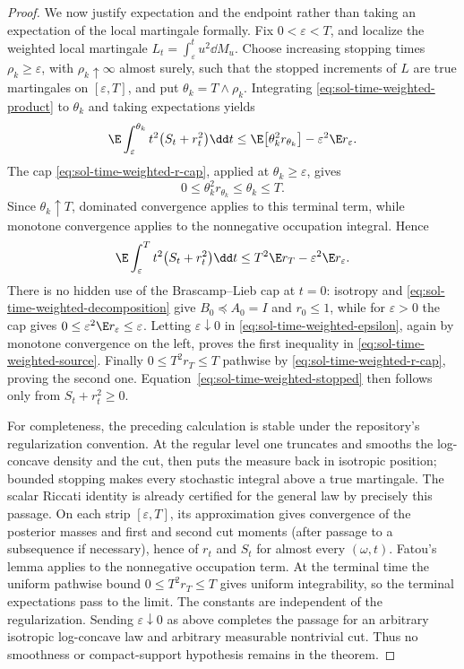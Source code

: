 \documentclass[../main.tex]{subfiles}
\begin{document}
\begin{proof}
We now justify expectation and the endpoint rather than taking an expectation of the local
martingale formally.  Fix $0<\varepsilon<T$, and localize the weighted local martingale
$L_t=\int_\varepsilon^t u^2\dd M_u$.  Choose increasing stopping times
$\rho_k\ge\varepsilon$, with $\rho_k\uparrow\infty$ almost surely, such that the stopped
increments of $L$ are true martingales on $[\varepsilon,T]$, and put
$\theta_k=T\wedge\rho_k$.  Integrating \eqref{eq:sol-time-weighted-product} to $\theta_k$ and
taking expectations yields
\begin{equation}
 \E\int_\varepsilon^{\theta_k}
      t^2\bigl(S_t+r_t^2\bigr)\dd t
 \le \E\bigl[\theta_k^2r_{\theta_k}\bigr]
      -\varepsilon^2\E r_\varepsilon.
 \label{eq:sol-time-weighted-localized}
\end{equation}
The cap \eqref{eq:sol-time-weighted-r-cap}, applied at $\theta_k\ge\varepsilon$, gives
\[
 0\le\theta_k^2r_{\theta_k}\le\theta_k\le T.
\]
Since $\theta_k\uparrow T$, dominated convergence applies to this terminal term, while monotone
convergence applies to the nonnegative occupation integral.  Hence
\begin{equation}
 \E\int_\varepsilon^Tt^2\bigl(S_t+r_t^2\bigr)\dd t
 \le T^2\E r_T-\varepsilon^2\E r_\varepsilon.
 \label{eq:sol-time-weighted-epsilon}
\end{equation}
There is no hidden use of the Brascamp--Lieb cap at $t=0$: isotropy and
\eqref{eq:sol-time-weighted-decomposition} give $B_0\preceq A_0=I$ and $r_0\le1$, while for
$\varepsilon>0$ the cap gives
$0\le\varepsilon^2\E r_\varepsilon\le\varepsilon$.  Letting
$\varepsilon\downarrow0$ in \eqref{eq:sol-time-weighted-epsilon}, again by monotone
convergence on the left, proves the first inequality in
\eqref{eq:sol-time-weighted-source}.  Finally
$0\le T^2r_T\le T$ pathwise by \eqref{eq:sol-time-weighted-r-cap}, proving the second one.
Equation~\eqref{eq:sol-time-weighted-stopped} then follows only from
$S_t+r_t^2\ge0$.

For completeness, the preceding calculation is stable under the repository's regularization
convention.  At the regular level one truncates and smooths the log-concave density and the cut,
then puts the measure back in isotropic position; bounded stopping makes every stochastic
integral above a true martingale.  The scalar Riccati identity is already certified for the
general law by precisely this passage.  On each strip $[\varepsilon,T]$, its approximation
gives convergence of the posterior masses and first and second cut moments (after passage to a
subsequence if necessary), hence of $r_t$ and $S_t$ for almost every $(\omega,t)$.  Fatou's
lemma applies to the nonnegative occupation term.  At the terminal time the uniform pathwise
bound $0\le T^2r_T\le T$ gives uniform integrability, so the terminal expectations pass to the
limit.  The constants are independent of the regularization.  Sending
$\varepsilon\downarrow0$ as above completes the passage for an arbitrary isotropic
log-concave law and arbitrary measurable nontrivial cut.  Thus no smoothness or compact-support
hypothesis remains in the theorem.
\end{proof}
\end{document}
